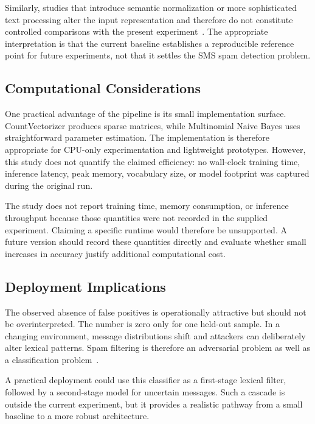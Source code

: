 \documentclass[conference]{IEEEtran}
\begin{document}
Similarly, studies that introduce semantic normalization or more sophisticated text processing alter the input representation and therefore do not constitute controlled comparisons with the present experiment~\cite{almeida2016normalization}. The appropriate interpretation is that the current baseline establishes a reproducible reference point for future experiments, not that it settles the SMS spam detection problem.

\subsection{Computational Considerations}
One practical advantage of the pipeline is its small implementation surface. CountVectorizer produces sparse matrices, while Multinomial Naive Bayes uses straightforward parameter estimation. The implementation is therefore appropriate for CPU-only experimentation and lightweight prototypes. However, this study does not quantify the claimed efficiency: no wall-clock training time, inference latency, peak memory, vocabulary size, or model footprint was captured during the original run.

The study does not report training time, memory consumption, or inference throughput because those quantities were not recorded in the supplied experiment. Claiming a specific runtime would therefore be unsupported. A future version should record these quantities directly and evaluate whether small increases in accuracy justify additional computational cost.

\subsection{Deployment Implications}
The observed absence of false positives is operationally attractive but should not be overinterpreted. The number is zero only for one held-out sample. In a changing environment, message distributions shift and attackers can deliberately alter lexical patterns. Spam filtering is therefore an adversarial problem as well as a classification problem~\cite{almeida2012occam}.

A practical deployment could use this classifier as a first-stage lexical filter, followed by a second-stage model for uncertain messages. Such a cascade is outside the current experiment, but it provides a realistic pathway from a small baseline to a more robust architecture.
\end{document}
